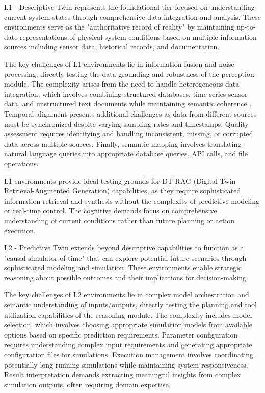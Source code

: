 L1 - Descriptive Twin represents the foundational tier focused on understanding current system states through comprehensive data integration and analysis. These environments serve as the "authoritative record of reality" by maintaining up-to-date representations of physical system conditions based on multiple information sources including sensor data, historical records, and documentation.

The key challenges of L1 environments lie in information fusion and noise processing, directly testing the data grounding and robustness of the perception module. The complexity arises from the need to handle heterogeneous data integration, which involves combining structured databases, time-series sensor data, and unstructured text documents while maintaining semantic coherence \cite{lu2020digital}. Temporal alignment presents additional challenges as data from different sources must be synchronized despite varying sampling rates and timestamps. Quality assessment requires identifying and handling inconsistent, missing, or corrupted data across multiple sources. Finally, semantic mapping involves translating natural language queries into appropriate database queries, API calls, and file operations.

L1 environments provide ideal testing grounds for DT-RAG (Digital Twin Retrieval-Augmented Generation) capabilities, as they require sophisticated information retrieval and synthesis without the complexity of predictive modeling or real-time control. The cognitive demands focus on comprehensive understanding of current conditions rather than future planning or action execution.

L2 - Predictive Twin extends beyond descriptive capabilities to function as a "causal simulator of time" that can explore potential future scenarios through sophisticated modeling and simulation. These environments enable strategic reasoning about possible outcomes and their implications for decision-making.

The key challenges of L2 environments lie in complex model orchestration and semantic understanding of inputs/outputs, directly testing the planning and tool utilization capabilities of the reasoning module. The complexity includes model selection, which involves choosing appropriate simulation models from available options based on specific prediction requirements. Parameter configuration requires understanding complex input requirements and generating appropriate configuration files for simulations. Execution management involves coordinating potentially long-running simulations while maintaining system responsiveness. Result interpretation demands extracting meaningful insights from complex simulation outputs, often requiring domain expertise.

